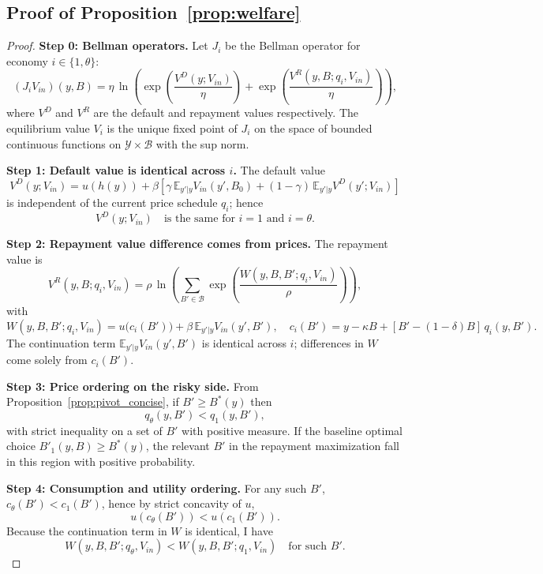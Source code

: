 \documentclass[12pt]{article}
\theoremstyle{plain}
\newcommand{\E}{\mathbb{E}}
\begin{document}
\subsection{Proof of Proposition~\ref{prop:welfare}}\label{app:proof_welfare}
\begin{proof}
	\textbf{Step 0: Bellman operators.}
	Let $J_i$ be the Bellman operator for economy $i\in\{1,\theta\}$:
	\[
		(J_iV_{in})(y,B)
		= \eta \,\ln\!\left(
		\exp\!\left(\frac{V^D(y;V_{in})}{\eta}\right)
		+ \exp\!\left(\frac{V^R(y,B;q_i,V_{in})}{\eta}\right)
		\right),
	\]
	where $V^D$ and $V^R$ are the default and repayment values respectively. The
	equilibrium value $V_i$ is the unique fixed point of $J_i$ on the space of
	bounded continuous functions on $\mathcal{Y}\times\mathcal{B}$ with the sup
	norm.

	\medskip
	\textbf{Step 1: Default value is identical across $i$.}
	The default value
	\[
		V^D(y;V_{in}) = u(h(y)) + \beta\left[\gamma\,\E_{y'|y}V_{in}(y',B_0)
		+ (1-\gamma)\,\E_{y'|y}V^D(y';V_{in})\right]
	\]
	is independent of the current price schedule $q_i$; hence
	\begin{equation}\label{eq:default_equal}
		V^D(y;V_{in}) \quad\text{is the same for $i=1$ and $i=\theta$}.
	\end{equation}

	\medskip
	\textbf{Step 2: Repayment value difference comes from prices.}
	The repayment value is
	\[
		V^R(y,B;q_i,V_{in})
		= \rho\,\ln\!\left(\sum_{B'\in\mathcal{B}} \exp\!\left(\frac{W(y,B,B';q_i,V_{in})}{\rho}\right)\right),
	\]
	with
	\[
		W(y,B,B';q_i,V_{in}) = u\!\big(c_i(B')\big) + \beta\,\E_{y'|y}V_{in}(y',B'),\quad
		c_i(B') = y - \kappa B + [B'-(1-\delta)B]\,q_i(y,B').
	\]
	The continuation term $\E_{y'|y}V_{in}(y',B')$ is identical across $i$;
	differences in $W$ come solely from $c_i(B')$.

	\medskip
	\textbf{Step 3: Price ordering on the risky side.}
	From Proposition~\ref{prop:pivot_concise}, if $B'\ge B^*(y)$ then
	\[
		q_\theta(y,B') < q_1(y,B'),
	\]
	with strict inequality on a set of $B'$ with positive measure. If the baseline
	optimal choice $B'_1(y,B)\ge B^*(y)$, the relevant $B'$ in the repayment
	maximization fall in this region with positive probability.

	\medskip
	\textbf{Step 4: Consumption and utility ordering.}
	For any such $B'$, $c_\theta(B') < c_1(B')$, hence by strict concavity of $u$,
	\[
		u(c_\theta(B')) < u(c_1(B')).
	\]
	Because the continuation term in $W$ is identical, I have
	\begin{equation}\label{eq:choice_value_order}
		W(y,B,B';q_\theta,V_{in}) < W(y,B,B';q_1,V_{in})
		\quad\text{for such $B'$}.
	\end{equation}


\end{proof}
\end{document}
